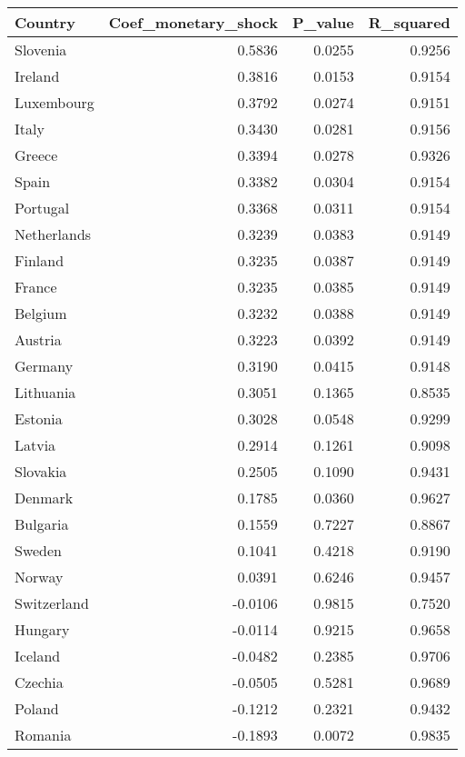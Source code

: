 \begin{tabular}{lrrr}
\toprule
Country & Coef_monetary_shock & P_value & R_squared \\
\midrule
Slovenia & 0.5836 & 0.0255 & 0.9256 \\
Ireland & 0.3816 & 0.0153 & 0.9154 \\
Luxembourg & 0.3792 & 0.0274 & 0.9151 \\
Italy & 0.3430 & 0.0281 & 0.9156 \\
Greece & 0.3394 & 0.0278 & 0.9326 \\
Spain & 0.3382 & 0.0304 & 0.9154 \\
Portugal & 0.3368 & 0.0311 & 0.9154 \\
Netherlands & 0.3239 & 0.0383 & 0.9149 \\
Finland & 0.3235 & 0.0387 & 0.9149 \\
France & 0.3235 & 0.0385 & 0.9149 \\
Belgium & 0.3232 & 0.0388 & 0.9149 \\
Austria & 0.3223 & 0.0392 & 0.9149 \\
Germany & 0.3190 & 0.0415 & 0.9148 \\
Lithuania & 0.3051 & 0.1365 & 0.8535 \\
Estonia & 0.3028 & 0.0548 & 0.9299 \\
Latvia & 0.2914 & 0.1261 & 0.9098 \\
Slovakia & 0.2505 & 0.1090 & 0.9431 \\
Denmark & 0.1785 & 0.0360 & 0.9627 \\
Bulgaria & 0.1559 & 0.7227 & 0.8867 \\
Sweden & 0.1041 & 0.4218 & 0.9190 \\
Norway & 0.0391 & 0.6246 & 0.9457 \\
Switzerland & -0.0106 & 0.9815 & 0.7520 \\
Hungary & -0.0114 & 0.9215 & 0.9658 \\
Iceland & -0.0482 & 0.2385 & 0.9706 \\
Czechia & -0.0505 & 0.5281 & 0.9689 \\
Poland & -0.1212 & 0.2321 & 0.9432 \\
Romania & -0.1893 & 0.0072 & 0.9835 \\
\bottomrule
\end{tabular}
